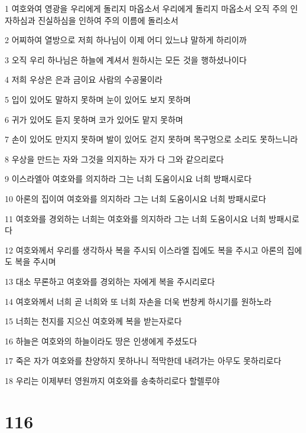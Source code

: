 \par 1 여호와여 영광을 우리에게 돌리지 마옵소서 우리에게 돌리지 마옵소서 오직 주의 인자하심과 진실하심을 인하여 주의 이름에 돌리소서
\par 2 어찌하여 열방으로 저희 하나님이 이제 어디 있느냐 말하게 하리이까
\par 3 오직 우리 하나님은 하늘에 계셔서 원하시는 모든 것을 행하셨나이다
\par 4 저희 우상은 은과 금이요 사람의 수공물이라
\par 5 입이 있어도 말하지 못하며 눈이 있어도 보지 못하며
\par 6 귀가 있어도 듣지 못하며 코가 있어도 맡지 못하며
\par 7 손이 있어도 만지지 못하며 발이 있어도 걷지 못하며 목구멍으로 소리도 못하느니라
\par 8 우상을 만드는 자와 그것을 의지하는 자가 다 그와 같으리로다
\par 9 이스라엘아 여호와를 의지하라 그는 너희 도움이시요 너희 방패시로다
\par 10 아론의 집이여 여호와를 의지하라 그는 너희 도움이시요 너희 방패시로다
\par 11 여호와를 경외하는 너희는 여호와를 의지하라 그는 너희 도움이시요 너희 방패시로다
\par 12 여호와께서 우리를 생각하사 복을 주시되 이스라엘 집에도 복을 주시고 아론의 집에도 복을 주시며
\par 13 대소 무론하고 여호와를 경외하는 자에게 복을 주시리로다
\par 14 여호와께서 너희 곧 너희와 또 너희 자손을 더욱 번창케 하시기를 원하노라
\par 15 너희는 천지를 지으신 여호와께 복을 받는자로다
\par 16 하늘은 여호와의 하늘이라도 땅은 인생에게 주셨도다
\par 17 죽은 자가 여호와를 찬양하지 못하나니 적막한데 내려가는 아무도 못하리로다
\par 18 우리는 이제부터 영원까지 여호와를 송축하리로다 할렐루야

\chapter{116}

